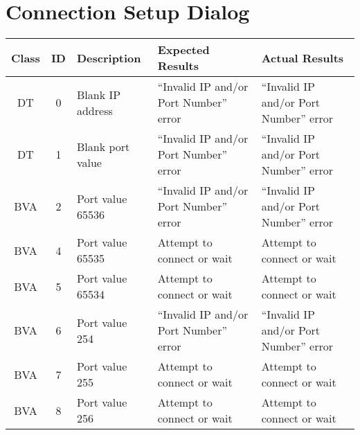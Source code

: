 \documentclass{article}
\begin{document}
\section{Connection Setup Dialog}
\begin{center}
\begin{longtable}{|c|c|p{4cm}|p{4cm}|p{4cm}|}
\hline
Class & ID & Description & Expected Results & Actual Results \\ \hline
DT  & 0 & Blank IP address & ``Invalid IP and/or Port Number'' error & ``Invalid IP and/or Port Number'' error \\ \hline
DT  & 1 & Blank port value & ``Invalid IP and/or Port Number'' error & ``Invalid IP and/or Port Number'' error \\ \hline
BVA & 2 & Port value 65536 & ``Invalid IP and/or Port Number'' error & ``Invalid IP and/or Port Number'' error \\ \hline
BVA & 4 & Port value 65535 & Attempt to connect or wait & Attempt to connect or wait \\ \hline
BVA & 5 & Port value 65534 & Attempt to connect or wait & Attempt to connect or wait \\ \hline
BVA & 6 & Port value 254 & ``Invalid IP and/or Port Number'' error & ``Invalid IP and/or Port Number'' error \\ \hline
BVA & 7 & Port value 255 & Attempt to connect or wait & Attempt to connect or wait \\ \hline
BVA & 8 & Port value 256 & Attempt to connect or wait & Attempt to connect or wait \\ \hline
\end{longtable}
\end{center}
\end{document}
